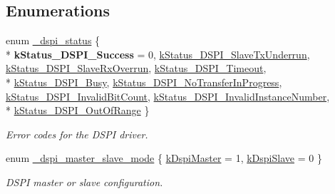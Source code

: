 \subsection*{Enumerations}
\begin{DoxyCompactItemize}
\item 
enum \hyperlink{group__dspi__hal_ga06b41ab984bc03e6f1eb07988edcb3ea}{\+\_\+dspi\+\_\+status} \{ \\*
{\bfseries k\+Status\+\_\+\+D\+S\+P\+I\+\_\+\+Success} = 0, 
\hyperlink{group__dspi__hal_gga06b41ab984bc03e6f1eb07988edcb3eaa9e7142dae4811be5426a39b6ddb40c31}{k\+Status\+\_\+\+D\+S\+P\+I\+\_\+\+Slave\+Tx\+Underrun}, 
\hyperlink{group__dspi__hal_gga06b41ab984bc03e6f1eb07988edcb3eaaba716de1ad68e6351cd2d26d0985b2e6}{k\+Status\+\_\+\+D\+S\+P\+I\+\_\+\+Slave\+Rx\+Overrun}, 
\hyperlink{group__dspi__hal_gga06b41ab984bc03e6f1eb07988edcb3eaa2509eed6de02d7a5c463d3c7b8b68eef}{k\+Status\+\_\+\+D\+S\+P\+I\+\_\+\+Timeout}, 
\\*
\hyperlink{group__dspi__hal_gga06b41ab984bc03e6f1eb07988edcb3eaad5ecc8346da4119b8609c6bcb4c57e40}{k\+Status\+\_\+\+D\+S\+P\+I\+\_\+\+Busy}, 
\hyperlink{group__dspi__hal_gga06b41ab984bc03e6f1eb07988edcb3eaacec0b51b1aaabedb0343cdbb07754d01}{k\+Status\+\_\+\+D\+S\+P\+I\+\_\+\+No\+Transfer\+In\+Progress}, 
\hyperlink{group__dspi__hal_gga06b41ab984bc03e6f1eb07988edcb3eaa41231c8e5ed53006eaa1a49ed5a5a904}{k\+Status\+\_\+\+D\+S\+P\+I\+\_\+\+Invalid\+Bit\+Count}, 
\hyperlink{group__dspi__hal_gga06b41ab984bc03e6f1eb07988edcb3eaa6c53f1865e5e78c67f06ff1238b27fdc}{k\+Status\+\_\+\+D\+S\+P\+I\+\_\+\+Invalid\+Instance\+Number}, 
\\*
\hyperlink{group__dspi__hal_gga06b41ab984bc03e6f1eb07988edcb3eaac1713712f0410e28da008d714734a6bd}{k\+Status\+\_\+\+D\+S\+P\+I\+\_\+\+Out\+Of\+Range}
 \}\begin{DoxyCompactList}\small\item\em Error codes for the D\+S\+PI driver. \end{DoxyCompactList}
\item 
enum \hyperlink{group__dspi__hal_ga22d5d3420ce510463f61e41cbe1d1410}{\+\_\+dspi\+\_\+master\+\_\+slave\+\_\+mode} \{ \hyperlink{group__dspi__hal_gga22d5d3420ce510463f61e41cbe1d1410abf70091c32d55b88b5cdf4993fd252b6}{k\+Dspi\+Master} = 1, 
\hyperlink{group__dspi__hal_gga22d5d3420ce510463f61e41cbe1d1410aff050dc09b18c67f40105d176c787e0a}{k\+Dspi\+Slave} = 0
 \}\begin{DoxyCompactList}\small\item\em D\+S\+PI master or slave configuration. \end{DoxyCompactList}

\end{DoxyCompactItemize}
